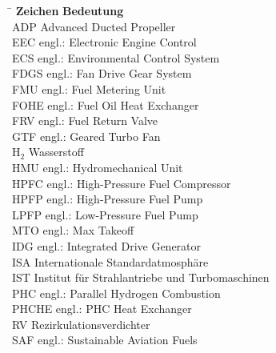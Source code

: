 \begin{tabbing}
	\hspace*{3cm} \= \hspace*{8cm} \kill
	\textbf{Zeichen} \> \textbf{Bedeutung} 							\\[5mm]
    ADP     \>  Advanced Ducted Propeller                           \\
    EEC     \>  engl.: Electronic Engine Control                    \\
    ECS     \>  engl.: Environmental Control System                 \\
    FDGS    \>  engl.: Fan Drive Gear System                        \\
    FMU     \>  engl.: Fuel Metering Unit                           \\
    FOHE    \>  engl.: Fuel Oil Heat Exchanger                      \\
    FRV     \>  engl.: Fuel Return Valve                            \\
    GTF 	\> 	engl.: Geared Turbo Fan 							\\
    H$_2$ 	\> 	Wasserstoff 										\\
    HMU     \>  engl.: Hydromechanical Unit                         \\
    HPFC    \>  engl.: High-Pressure Fuel Compressor                \\
    HPFP    \>  engl.: High-Pressure Fuel Pump                      \\
    LPFP    \>  engl.: Low-Pressure Fuel Pump                       \\
    MTO     \>  engl.: Max Takeoff                                  \\
    IDG     \>  engl.: Integrated Drive Generator                   \\
    ISA     \>  Internationale Standardatmosphäre                   \\
	IST		\> 	Institut für Strahlantriebe und Turbomaschinen		\\
    PHC     \>  engl.: Parallel Hydrogen Combustion                 \\
    PHCHE   \>  engl.: PHC Heat Exchanger                           \\
    RV      \>  Rezirkulationsverdichter                            \\
    SAF 	\> 	engl.: Sustainable Aviation Fuels 					\\

\end{tabbing}